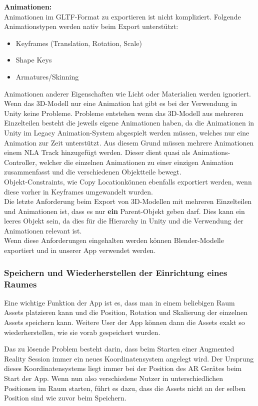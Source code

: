 \documentclass[titlepage, a4paper, 11pt]{scrartcl}
\begin{document}
  \textbf{Animationen:}\\
  Animationen im GLTF-Format zu exportieren ist nicht kompliziert. Folgende Animationstypen werden nativ beim Export unterstützt:
  \begin{itemize}
  \item Keyframes (Translation, Rotation, Scale)
  \item Shape Keys
  \item Armatures/Skinning
  \end{itemize}
  Animationen anderer Eigenschaften wie Licht oder Materialien werden ignoriert.\\
  Wenn das 3D-Modell nur eine Animation hat gibt es bei der Verwendung in Unity keine Probleme. Probleme entstehen wenn das 3D-Modell aus mehreren Einzelteilen besteht die jeweils eigene Animationen haben, da die Animationen in Unity im Legacy Animation-System abgespielt werden müssen, welches nur eine Animation zur Zeit unterstützt. Aus diesem Grund müssen mehrere Animationen einem NLA Track hinzugefügt werden. Dieser dient quasi als Animations-Controller, welcher die einzelnen Animationen zu einer einzigen Animation zusammenfasst und die verschiedenen Objektteile bewegt.\\
  Objekt-Constraints, wie \glqq Copy Location\grqq können ebenfalls exportiert werden, wenn diese vorher in Keyframes umgewandelt wurden.\\
  Die letzte Anforderung beim Export von 3D-Modellen mit mehreren Einzelteilen und Animationen ist, dass es nur \textbf{ein} Parent-Objekt geben darf. Dies kann ein leeres Objekt sein, da dies für die Hierarchy in Unity und die Verwendung der Animationen relevant ist.\\

  Wenn diese Anforderungen eingehalten werden können Blender-Modelle exportiert und in unserer App verwendet werden.

  \subsubsection{Speichern und Wiederherstellen der Einrichtung eines Raumes}

  Eine wichtige Funktion der App ist es, dass man in einem beliebigen Raum Assets platzieren kann und die Position, Rotation und Skalierung der einzelnen Assets speichern kann.
  Weitere User der App können dann die Assets exakt so wiederherstellen, wie sie vorab gespeichert wurden.

  Das zu lösende Problem besteht darin, dass beim Starten einer Augmented Reality Session immer ein neues Koordinatensystem angelegt wird.
  Der Ursprung dieses Koordinatensystems liegt immer bei der Position des AR Gerätes beim Start der App.
  Wenn nun also verschiedene Nutzer in unterschiedlichen Positionen im Raum starten, führt es dazu, dass die Assets nicht an der selben Position sind wie zuvor beim Speichern.
  
\end{document}

